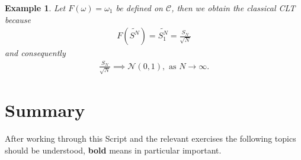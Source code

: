 \documentclass[11pt,a4paper, final]{article}
\newtheorem{exmp}{Example}[section]
\theoremstyle{definition}
\begin{document}
\begin{exmp} Let $F( \omega) = \omega_1$ be defined on $\mathcal{C}$, then we obtain the classical CLT because 
\begin{align*}
F(\widetilde{S^N})=\widetilde{S_1^N} = \frac{S_N}{\sqrt{N}} 
\end{align*}
and consequently 
\begin{align*}
\frac{S_N}{\sqrt{N}} \implies \mathcal{N}(0,1), \text{ as } N \to \infty. 
\end{align*}
\end{exmp}
\newpage
\section{Summary}
After working through this Script and the relevant exercises the following topics should be understood, \textbf{bold} means in particular important. 
\end{document}
